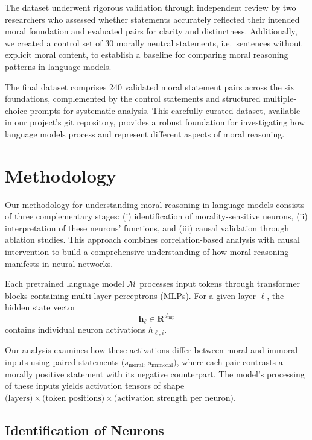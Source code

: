 \documentclass[runninghheads]{llncs}
\begin{document}
The dataset underwent rigorous validation through independent review by two researchers who assessed whether statements accurately reflected their intended moral foundation and evaluated pairs for clarity and distinctness. Additionally, we created a control set of 30 morally neutral statements, i.e.~sentences without explicit moral content, to establish a baseline for comparing moral reasoning patterns in language models.

The final dataset comprises 240 validated moral statement pairs across the six foundations, complemented by the control statements and structured multiple-choice prompts for systematic analysis. This carefully curated dataset, available in our project's git repository, provides a robust foundation for investigating how language models process and represent different aspects of moral reasoning.




\section{Methodology}
\label{methodology}

Our methodology for understanding moral reasoning in language models consists of three complementary stages: (i) identification of morality-sensitive neurons, (ii) interpretation of these neurons' functions, and (iii) causal validation through ablation studies. This approach combines correlation-based analysis with causal intervention to build a comprehensive understanding of how moral reasoning manifests in neural networks.

Each pretrained language model $\mathcal{M}$ processes input tokens through transformer blocks containing multi-layer perceptrons (MLPs). For a given layer  $\ell$, the hidden state vector
$$
\mathbf{h}_{\ell} \in \mathbf{R}^{d_{\text{mlp}}} 
$$
contains individual neuron activations $h_{\ell, i}$. 

Our analysis examines how these activations differ between moral and immoral inputs using paired statements $\bigl(s_{\mathrm{moral}}, s_{\mathrm{immoral}}\bigr)$, where each pair contrasts a morally positive statement with its negative counterpart. 
The model's processing of these inputs yields activation tensors of shape $\text{(layers)} \times \text{(token positions)} \times \text{(activation strength per neuron)}$.



\subsection{Identification of Neurons}
\end{document}
